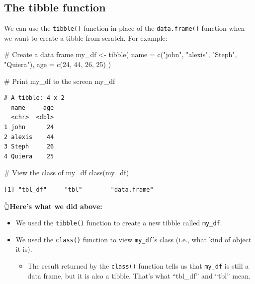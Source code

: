 \documentclass[
  letterpaper,
  DIV=11,
  numbers=noendperiod]{scrreprt}
\newenvironment{Shaded}{\begin{snugshade}}{\end{snugshade}}
\newcommand{\AttributeTok}[1]{\textcolor[rgb]{0.40,0.45,0.13}{#1}}
\newcommand{\CommentTok}[1]{\textcolor[rgb]{0.37,0.37,0.37}{#1}}
\newcommand{\DecValTok}[1]{\textcolor[rgb]{0.68,0.00,0.00}{#1}}
\newcommand{\FunctionTok}[1]{\textcolor[rgb]{0.28,0.35,0.67}{#1}}
\newcommand{\NormalTok}[1]{\textcolor[rgb]{0.00,0.23,0.31}{#1}}
\newcommand{\OtherTok}[1]{\textcolor[rgb]{0.00,0.23,0.31}{#1}}
\newcommand{\StringTok}[1]{\textcolor[rgb]{0.13,0.47,0.30}{#1}}
\providecommand{\tightlist}{%
  \setlength{\itemsep}{0pt}\setlength{\parskip}{0pt}}\usepackage{longtable,booktabs,array}
\begin{document}
\subsection{The tibble function}\label{the-tibble-function}

We can use the \texttt{tibble()} function in place of the
\texttt{data.frame()} function when we want to create a tibble from
scratch. For example:

\begin{Shaded}
\begin{Highlighting}[]
\CommentTok{\# Create a data frame}
\NormalTok{my\_df }\OtherTok{\textless{}{-}} \FunctionTok{tibble}\NormalTok{(}
  \AttributeTok{name =} \FunctionTok{c}\NormalTok{(}\StringTok{"john"}\NormalTok{, }\StringTok{"alexis"}\NormalTok{, }\StringTok{"Steph"}\NormalTok{, }\StringTok{"Quiera"}\NormalTok{),}
  \AttributeTok{age  =} \FunctionTok{c}\NormalTok{(}\DecValTok{24}\NormalTok{, }\DecValTok{44}\NormalTok{, }\DecValTok{26}\NormalTok{, }\DecValTok{25}\NormalTok{)}
\NormalTok{)}

\CommentTok{\# Print my\_df to the screen}
\NormalTok{my\_df}
\end{Highlighting}
\end{Shaded}

\begin{verbatim}
# A tibble: 4 x 2
  name     age
  <chr>  <dbl>
1 john      24
2 alexis    44
3 Steph     26
4 Quiera    25
\end{verbatim}

\begin{Shaded}
\begin{Highlighting}[]
\CommentTok{\# View the class of my\_df}
\FunctionTok{class}\NormalTok{(my\_df)}
\end{Highlighting}
\end{Shaded}

\begin{verbatim}
[1] "tbl_df"     "tbl"        "data.frame"
\end{verbatim}

👆\textbf{Here's what we did above:}

\begin{itemize}
\item
  We used the \texttt{tibble()} function to create a new tibble called
  \texttt{my\_df}.
\item
  We used the \texttt{class()} function to view \texttt{my\_df}'s class
  (i.e., what kind of object it is).

  \begin{itemize}
  \tightlist
  \item
    The result returned by the \texttt{class()} function tells us that
    \texttt{my\_df} is still a data frame, but it is also a tibble.
    That's what ``tbl\_df'' and ``tbl'' mean.
  \end{itemize}
\end{itemize}
\end{document}
